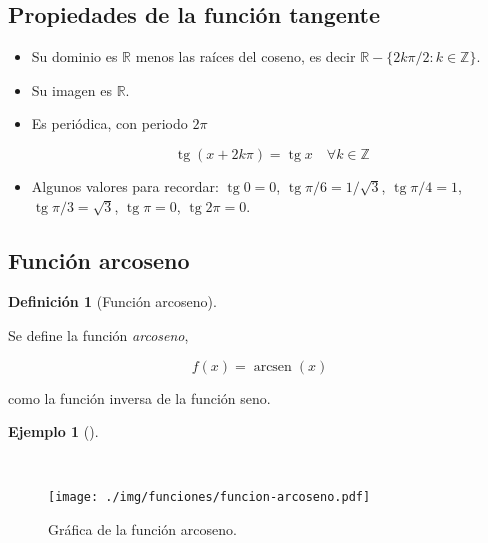 \documentclass[
  a4paper,
]{scrreport}
\theoremstyle{plain}
\theoremstyle{definition}
\theoremstyle{plain}
\theoremstyle{plain}
\theoremstyle{definition}
\newtheorem{example}{Ejemplo}[chapter]
\theoremstyle{definition}
\newtheorem{definition}{Definición}[chapter]
\theoremstyle{remark}
\begin{document}
\subsection{Propiedades de la función
tangente}\label{propiedades-de-la-funciuxf3n-tangente}

\begin{itemize}
\item
  Su dominio es \(\mathbb{R}\) menos las raíces del coseno, es decir
  \(\mathbb{R}-\{2k\pi/2: k\in \mathbb{Z}\}\).
\item
  Su imagen es \(\mathbb{R}\).
\item
  Es periódica, con periodo \(2\pi\)

  \[\operatorname{tg} (x+2k\pi)= \operatorname{tg} x\quad \forall k\in \mathbb{Z}\]
\item
  Algunos valores para recordar: \(\operatorname{tg} 0=0\),
  \(\operatorname{tg} \pi/6= 1/\sqrt{3}\),
  \(\operatorname{tg} \pi/4=1\), \(\operatorname{tg} \pi/3= \sqrt{3}\),
  \(\operatorname{tg} \pi =0\), \(\operatorname{tg} 2\pi=0\).
\end{itemize}

\subsection{Función arcoseno}\label{funciuxf3n-arcoseno}

\begin{definition}[Función
arcoseno]\protect\hypertarget{def-funcion-arcoseno}{}\label{def-funcion-arcoseno}

Se define la función \emph{arcoseno},

\[f(x)=\operatorname{arcsen}(x)\]

como la función inversa de la función seno.

\end{definition}

\begin{example}[]\protect\hypertarget{exm-funcion-arcoseno}{}\label{exm-funcion-arcoseno}

~

\begin{figure}[H]

{\centering \texttt{[image: ./img/funciones/funcion-arcoseno.pdf]}

}

\caption{Gráfica de la función arcoseno.}

\end{figure}%

\end{example}
\end{document}

